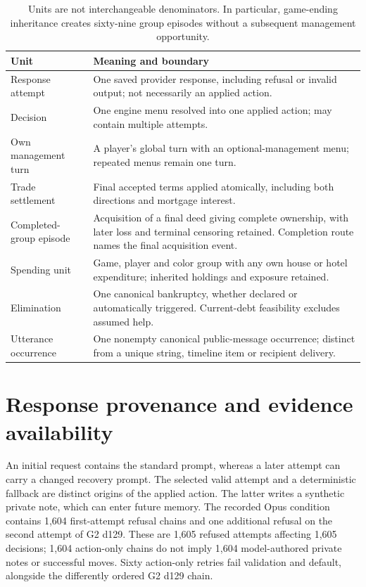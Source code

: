 \begin{table}[htbp]
\centering\small
\begin{tabularx}{\linewidth}{L{3.2cm}Y}
\toprule Unit & Meaning and boundary\\\midrule
Response attempt & One saved provider response, including refusal or invalid output; not necessarily an applied action.\\
Decision & One engine menu resolved into one applied action; may contain multiple attempts.\\
Own management turn & A player's global turn with an optional-management menu; repeated menus remain one turn.\\
Trade settlement & Final accepted terms applied atomically, including both directions and mortgage interest.\\
Completed-group episode & Acquisition of a final deed giving complete ownership, with later loss and terminal censoring retained. Completion route names the final acquisition event.\\
Spending unit & Game, player and color group with any own house or hotel expenditure; inherited holdings and exposure retained.\\
Elimination & One canonical bankruptcy, whether declared or automatically triggered. Current-debt feasibility excludes assumed help.\\
Utterance occurrence & One nonempty canonical public-message occurrence; distinct from a unique string, timeline item or recipient delivery.\\
\bottomrule
\end{tabularx}
\caption{Units are not interchangeable denominators. In particular, game-ending inheritance creates sixty-nine group episodes without a subsequent management opportunity.}
\end{table}

\section{Response provenance and evidence availability}
\label{app:channels}

An initial request contains the standard prompt, whereas a later attempt can carry a changed recovery prompt. The selected valid attempt and a deterministic fallback are distinct origins of the applied action. The latter writes a synthetic private note, which can enter future memory. The recorded Opus condition contains 1,604 first-attempt refusal chains and one additional refusal on the second attempt of G2 d129. These are 1,605 refused attempts affecting 1,605 decisions; 1,604 action-only chains do not imply 1,604 model-authored private notes or successful moves. Sixty action-only retries fail validation and default, alongside the differently ordered G2 d129 chain.

